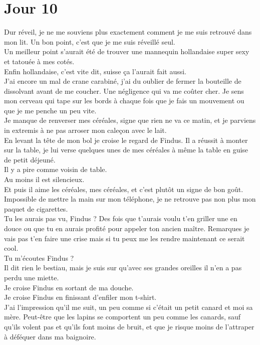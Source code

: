 \chapter*{Jour 10}
Dur réveil, je ne me souviens plus exactement comment je me suis retrouvé dans mon lit. Un bon point, c'est que je me suis réveillé seul. \\

Un meilleur point s'aurait été de trouver une mannequin hollandaise super sexy et tatouée à mes cotés. \\
Enfin hollandaise, c'est vite dit, suisse ça l'aurait fait aussi. \\

J'ai encore un mal de crane carabiné, j'ai du oublier de fermer la bouteille de dissolvant avant de me coucher. Une négligence qui va me coûter cher. Je sens mon cerveau qui tape sur les bords à chaque fois que je fais un mouvement ou que je me penche un peu vite.\\

Je manque de renverser mes céréales, signe que rien ne va ce matin, et je parviens in extremis à ne pas arroser mon caleçon avec le lait. \\
En levant la tête de mon bol je croise le regard de Findus. Il a réussit à monter sur la table, je lui verse quelques unes de mes céréales à même la table en guise de petit déjeuné. \\

Il y a pire comme voisin de table. \\
Au moins il est silencieux. \\
Et puis il aime les céréales, mes céréales, et c'est plutôt un signe de bon goût. \\

Impossible de mettre la main sur mon téléphone, je ne retrouve pas non plus mon paquet de cigarettes. \\
Tu les aurais pas vu, Findus ? Des fois que t'aurais voulu t'en griller une en douce ou que tu en aurais profité pour appeler ton ancien maître. Remarques je vais pas t'en faire une crise mais si tu peux me les rendre maintenant ce serait cool. \\
Tu m'écoutes Findus ?\\
Il dit rien le bestiau, mais je suis sur qu'avec ses grandes oreilles il n'en a pas perdu une miette. \\

Je croise Findus en sortant de ma douche. \\
Je croise Findus en finissant d'enfiler mon t-shirt. \\
J'ai l'impression qu'il me suit, un peu comme si c'était un petit canard et moi sa mère. Peut-être que les lapins se comportent un peu comme les canards, sauf qu'ils volent pas et qu'ils font moins de bruit, et que je risque moins de l'attraper à déféquer dans ma baignoire. \\

